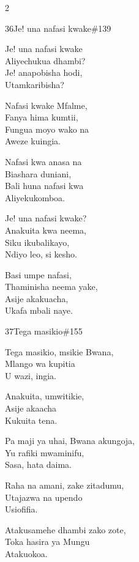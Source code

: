 \documentclass{article}
\begin{document}
\begin{multicols}{2}
\begin{hymn}{36}{Je! una nafasi kwake}{\#139}
\begin{stanza}
Je! una nafasi kwake\\
Aliyechukua dhambi?\\
Je! anapobisha hodi,\\
Utamkaribisha?
\end{stanza}
\begin{chorus}
Nafasi kwake Mfalme,\\
Fanya hima kumtii,\\
Fungua moyo wako na\\
Aweze kuingia.
\end{chorus}
\begin{stanza}
Nafasi kwa anasa na\\
Biashara duniani,\\
Bali huna nafasi kwa\\
Aliyekukomboa.
\end{stanza}
\begin{stanza}
Je! una nafasi kwake?\\
Anakuita kwa neema,\\
Siku ikubalikayo,\\
Ndiyo leo, si kesho.
\end{stanza}
\begin{stanza}
Basi umpe nafasi,\\
Thaminisha neema yake,\\
Asije akakuacha,\\
Ukafa mbali naye.
\end{stanza}
\end{hymn}

\begin{hymn}{37}{Tega masikio}{\#155}
\begin{stanza}
Tega masikio, msikie Bwana,\\
Mlango wa kupitia\\
U wazi, ingia.
\end{stanza}
\begin{chorus}
Anakuita, umwitikie,\\
Asije akaacha\\
Kukuita tena.
\end{chorus}
\begin{stanza}
Pa maji ya uhai, Bwana akungoja,\\
Yu rafiki mwaminifu,\\
Sasa, hata daima.
\end{stanza}
\begin{stanza}
Raha na amani, zake zitadumu,\\
Utajazwa na upendo\\
Usiofifia.
\end{stanza}
\begin{stanza}
Atakusamehe dhambi zako zote,\\
Toka hasira ya Mungu\\
Atakuokoa.
\end{stanza}
\end{hymn}


\end{multicols}
\end{document}
